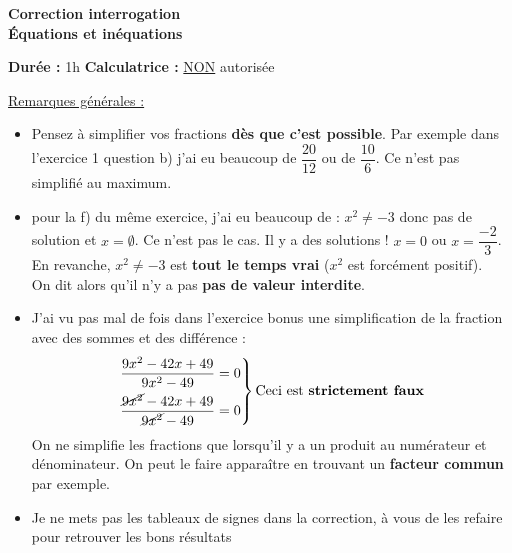 \documentclass[12pt,a4paper]{exam}
\begin{document}
\begin{center}
    \Large\textbf{Correction interrogation\\Équations et inéquations}
\end{center}

\vspace{0.3cm}

\noindent
\textbf{Durée :} 1h \hfill
\textbf{Calculatrice :} \underline{NON} autorisée

\vspace{0.5cm}


\underline{Remarques générales :}
\vspace{5pt}
{\color{red}
\begin{itemize}
    \item Pensez à simplifier vos fractions \textbf{dès que c'est possible}. Par exemple dans 
l'exercice 1 question b) j'ai eu beaucoup de $\dfrac{20}{12}$ ou de $\dfrac{10}{6}$. Ce 
n'est pas simplifié au maximum.
\vspace{5pt}
    \item pour la f) du même exercice, j'ai eu beaucoup de : $x^2 \neq -3$ donc pas de solution 
    et $x = \emptyset$. Ce n'est pas le cas. Il y a des solutions ! $x = 0$ ou $x = \dfrac{-2}{3}$. En 
    revanche, $x^2 \neq -3$ est \textbf{tout le temps vrai} ($x^2$ est forcément positif).
    \\On dit alors qu'il n'y a pas \textbf{pas de valeur interdite}.
    \vspace{5pt}
    \item J'ai vu pas mal de fois dans l'exercice bonus une simplification de la fraction avec 
    des sommes et des différence : 
    \[
        \left.
        \begin{aligned}
        \dfrac{9x^2-42x+49}{9x^2-49} = 0 & \\
        \dfrac{\cancel{9x^2}-42x+49}{\cancel{9x^2}-49} = 0
        \end{aligned}
        \right\}
        \text{Ceci est \textbf{strictement faux}}
    \]
    On ne simplifie les fractions que lorsqu'il y a un produit
    au numérateur et dénominateur. On peut le faire apparaître en trouvant un \textbf{facteur commun}
    par exemple.
    \vspace{5pt}
    \item Je ne mets pas les tableaux de signes dans la correction, à vous de les refaire pour retrouver 
    les bons résultats
\end{itemize}
}
\end{document}

